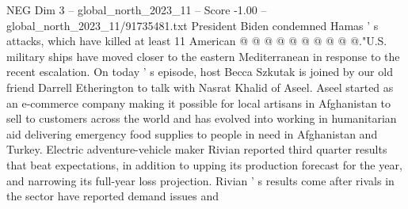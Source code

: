 \begin{textsample}{NEG Dim 3 – global\_north\_2023\_11 – Score -1.00 – global\_north\_2023\_11/91735481.txt}
President Biden condemned Hamas ' s attacks, which have killed at least 11 American @ @ @ @ @ @ @ @ @ @."U.S. military ships have moved closer to the eastern Mediterranean in response to the recent escalation.
On today ' s episode, host Becca Szkutak is joined by our old friend Darrell Etherington to talk with Nasrat Khalid of Aseel.
Aseel started as an e-commerce company making it possible for local artisans in Afghanistan to sell to customers across the world and has evolved into working in humanitarian aid delivering emergency food supplies to people in need in Afghanistan and Turkey.
Electric adventure-vehicle maker Rivian reported third quarter results that beat expectations, in addition to upping its production forecast for the year, and narrowing its full-year loss projection.
Rivian ' s results come after rivals in the sector have reported demand issues and

\end{textsample}
